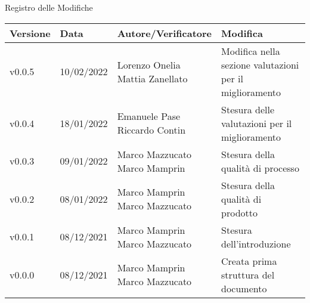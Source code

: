 \begin{center}
  \huge{Registro delle Modifiche}
\end{center}
\newcommand{\aCapo}[1]{%
  \begin{tabular}{@{}c@{}}\strut#1\strut\end{tabular}%
}
\begin{center}
  \begin{longtable}{|p{1.8cm}|p{2.1cm}|p{4.2cm}|p{4.5cm}|}
    \hline
    \textbf{Versione} & \textbf{Data} & \textbf{Autore/Verificatore}             & \textbf{Modifica}                                 \\ \hline
    v0.0.5            & 10/02/2022    & \aCapo{Lorenzo Onelia\\Mattia Zanellato} & Modifica nella sezione valutazioni per il miglioramento         \\ \hline
    v0.0.4            & 18/01/2022    & \aCapo{Emanuele Pase\\Riccardo Contin}   & Stesura delle valutazioni per il miglioramento    \\ \hline
    v0.0.3            & 09/01/2022    & \aCapo{Marco Mazzucato\\Marco Mamprin}   & Stesura della qualità di processo                 \\ \hline
    v0.0.2            & 08/01/2022    & \aCapo{Marco Mamprin\\Marco Mazzucato}   & Stesura della qualità di prodotto                 \\ \hline
    v0.0.1            & 08/12/2021    & \aCapo{Marco Mamprin\\Marco Mazzucato}   & Stesura dell'introduzione                         \\ \hline
    v0.0.0            & 08/12/2021    & \aCapo{Marco Mamprin\\Marco Mazzucato}   & Creata prima struttura del documento              \\ \hline
  \end{longtable}
\end{center}
